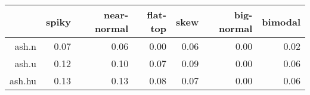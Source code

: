 \begin{tabular}{rrrrrrr}
  \toprule  & spiky & near-normal & flat-top & skew & big-normal & bimodal \\ 
  \midrule ash.n & 0.07 & 0.06 & 0.00 & 0.06 & 0.00 & 0.02 \\ 
  ash.u & 0.12 & 0.10 & 0.07 & 0.09 & 0.00 & 0.06 \\ 
  ash.hu & 0.13 & 0.13 & 0.08 & 0.07 & 0.00 & 0.06 \\ 
   \bottomrule \end{tabular}

